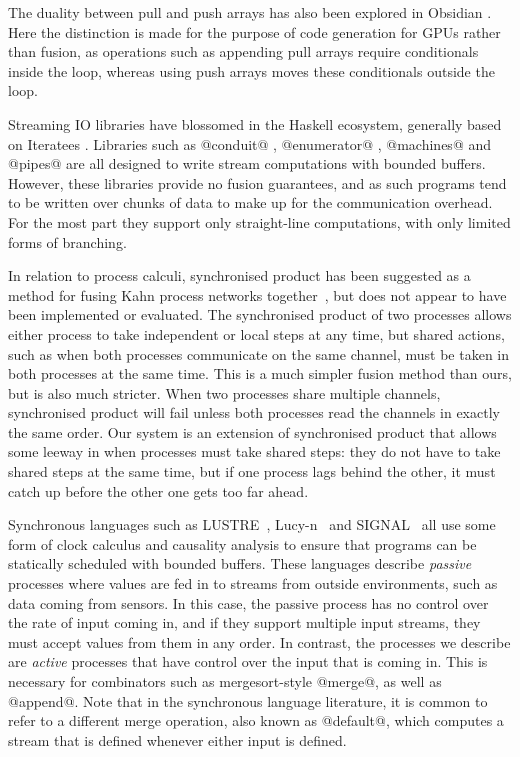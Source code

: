 The duality between pull and push arrays has also been explored in Obsidian \cite{claessen2012expressive, svensson2014defunctionalizing}.
Here the distinction is made for the purpose of code generation for GPUs rather than fusion, as operations such as appending pull arrays require conditionals inside the loop, whereas using push arrays moves these conditionals outside the loop.

Streaming IO libraries have blossomed in the Haskell ecosystem, generally based on Iteratees \cite{kiselyov2012iteratees}.
Libraries such as @conduit@ \cite{hackage:conduit}, @enumerator@ \cite{hackage:enumerator}, @machines@ \cite{hackage:machines} and @pipes@ \cite{hackage:pipes} are all designed to write stream computations with bounded buffers.
However, these libraries provide no fusion guarantees, and as such programs tend to be written over chunks of data to make up for the communication overhead.
For the most part they support only straight-line computations, with only limited forms of branching.

In relation to process calculi, synchronised product has been suggested as a method for fusing Kahn process networks together~\cite{fradet2004network}, but does not appear to have been implemented or evaluated.
The synchronised product of two processes allows either process to take independent or local steps at any time, but shared actions, such as when both processes communicate on the same channel, must be taken in both processes at the same time.
This is a much simpler fusion method than ours, but is also much stricter.
When two processes share multiple channels, synchronised product will fail unless both processes read the channels in exactly the same order.
Our system is an extension of synchronised product that allows some leeway in when processes must take shared steps: they do not have to take shared steps at the same time, but if one process lags behind the other, it must catch up before the other one gets too far ahead.

Synchronous languages such as LUSTRE~\cite{halbwachs1991synchronous}, Lucy-n~\cite{mandel2010lucy} and SIGNAL~\cite{le2003polychrony} all use some form of clock calculus and causality analysis to ensure that programs can be statically scheduled with bounded buffers.
These languages describe \emph{passive} processes where values are fed in to streams from outside environments, such as data coming from sensors.
In this case, the passive process has no control over the rate of input coming in, and if they support multiple input streams, they must accept values from them in any order.
In contrast, the processes we describe are \emph{active} processes that have control over the input that is coming in.
This is necessary for combinators such as mergesort-style @merge@, as well as @append@.
Note that in the synchronous language literature, it is common to refer to a different merge operation, also known as @default@, which computes a stream that is defined whenever either input is defined.

